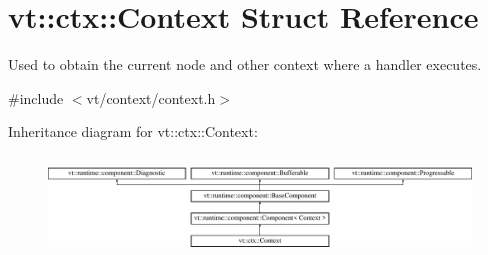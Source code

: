 \hypertarget{structvt_1_1ctx_1_1_context}{}\section{vt\+:\+:ctx\+:\+:Context Struct Reference}
\label{structvt_1_1ctx_1_1_context}


Used to obtain the current node and other context where a handler executes.  




{\ttfamily \#include $<$vt/context/context.\+h$>$}

Inheritance diagram for vt\+:\+:ctx\+:\+:Context\+:\begin{figure}[H]
\begin{center}
\leavevmode
\includegraphics[height=2.676225cm]{structvt_1_1ctx_1_1_context}
\end{center}
\end{figure}
